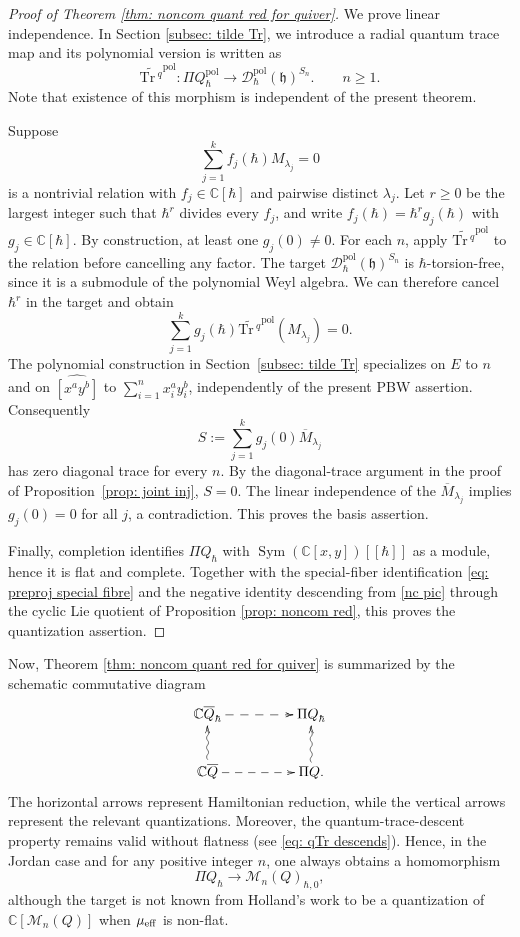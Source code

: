 \documentclass[11pt,reqno]{amsart}
\theoremstyle{definition}
\newcommand{\bbC}{\mathbb{C}}
\newcommand{\Tr}{\mathrm{Tr} \,}
\newcommand{\mD}{\mathcal{D}}
\newcommand{\QQ}{\mathbb{C} \overline{Q}}
\newcommand{\qneck}{{\mathbb{C} \overline{Q}}_{\hbar}}
\newcommand{\Sym}{\operatorname{Sym}}
\newcommand{\fkh}{\mathfrak{h}}
\newcommand{\mM}{\mathcal{M}}
\newcommand{\pol}{\mathrm{pol}}
\begin{document}
\begin{proof}[Proof of Theorem \ref{thm: noncom quant red for quiver}]
We prove linear independence.
In Section \ref{subsec: tilde Tr},
we introduce a radial quantum trace map and its polynomial version is written as
\[
\widetilde{\Tr^q}^\pol:\Pi Q_\hbar^{\pol}
\longrightarrow \mD_\hbar^{\pol}(\fkh)^{S_n}.
\qquad n\geq1.
\]
Note that existence of this morphism is independent of the present theorem.

Suppose
\[
\sum_{j=1}^k f_j(\hbar)M_{\lambda_j}=0
\]
is a nontrivial relation with \(f_j\in\mathbb C[\hbar]\) and pairwise
distinct \(\lambda_j\).
Let \(r\ge 0\) be the largest integer such that \(\hbar^r\) divides
every \(f_j\), and write \(f_j(\hbar)=\hbar^r g_j(\hbar)\) with
\(g_j\in\mathbb C[\hbar]\).
By construction, at least one \(g_j(0)\neq 0\).
For each \(n\), apply
\(\widetilde{\Tr^q}^\pol\) to the relation before cancelling any factor.
The target \(\mD_\hbar^\pol(\fkh)^{S_n}\) is
\(\hbar\)-torsion-free, since it is a submodule of the polynomial Weyl
algebra. We can therefore cancel \(\hbar^r\) in the target and obtain
\[
\sum_{j=1}^k g_j(\hbar)
\widetilde{\Tr^q}^\pol(M_{\lambda_j})=0.
\]
The polynomial construction in Section~\ref{subsec: tilde Tr} specializes
on \(E\) to \(n\) and on \(\widehat{[x^ay^b]}\) to
\(\sum_{i=1}^n x_i^ay_i^b\), independently of the present PBW assertion.
Consequently
\[
S:=\sum_{j=1}^k g_j(0)\overline M_{\lambda_j}
\]
has zero diagonal trace for every \(n\). By the diagonal-trace argument in the proof of
Proposition~\ref{prop: joint inj}, \(S=0\).
The linear independence of the \(\overline M_{\lambda_j}\) implies
\(g_j(0)=0\) for all \(j\), a contradiction.
This proves the basis assertion.

Finally, completion identifies \(\Pi Q_\hbar\) with
\(\Sym(\mathbb C[x,y])[[\hbar]]\) as a module,
hence it is flat and complete.
Together with the special-fiber identification
\eqref{eq: preproj special fibre} and the negative  identity
descending from \eqref{nc  pic} through the cyclic Lie quotient
of Proposition \ref{prop: noncom red},
this proves the quantization assertion.
\end{proof}


Now,
Theorem \ref{thm: noncom quant red for quiver} is summarized by the schematic commutative diagram
\begin{equation}
\begin{split}
\xymatrixcolsep{4pc}
\xymatrix{
	\qneck \ar@{-->}[r]
& {\Pi Q}_{\hbar} \\
\QQ \ar@{~>}[u] \ar@{-->}[r]& \Pi Q.
\ar@{~>}[u]}
\end{split}
\end{equation}
The horizontal arrows represent Hamiltonian reduction, while the vertical arrows represent the relevant quantizations.
Moreover, the quantum-trace-descent property  remains valid without flatness (see \eqref{eq: qTr descends}). Hence,
in the Jordan case and for any positive integer \(n\),
one always obtains a homomorphism
\[
{
\Pi Q_{\hbar} \longrightarrow \mM_n (Q)_{\hbar,0},
}
\]
although the target is not known from Holland's work to be a quantization of \(\bbC[\mM_n (Q)]\) when \(\mu_{\rm eff}\) is non-flat.
\end{document}
